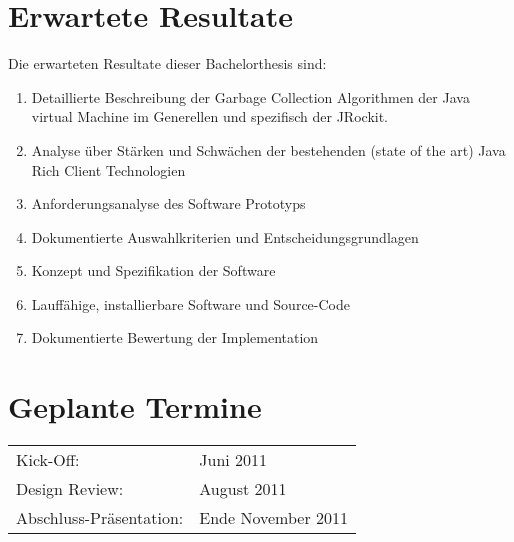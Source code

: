 \section{Erwartete Resultate}
Die erwarteten Resultate dieser Bachelorthesis sind:
\begin{enumerate}
\item Detaillierte Beschreibung der Garbage Collection Algorithmen der Java virtual 
    Machine im Generellen und spezifisch der JRockit.
\item Analyse über Stärken und Schwächen der bestehenden (state of the art) Java 
    Rich Client Technologien
\item Anforderungsanalyse des Software Prototyps
\item Dokumentierte Auswahlkriterien und Entscheidungsgrundlagen
\item Konzept und Spezifikation der Software
\item Lauffähige, installierbare Software und Source-Code
\item Dokumentierte Bewertung der Implementation
\end{enumerate}

\section{Geplante Termine}
\begin{tabular}[ht]{ll}
Kick-Off: & Juni 2011\\
Design Review: & August 2011\\
Abschluss-Präsentation: & Ende November 2011\\
\end{tabular}

